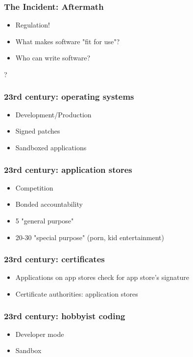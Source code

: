 \begin{frame}[fragile]
\frametitle{The Incident: Aftermath}

\begin{itemize}
\item Regulation!
\item What makes software "fit for use"?
\item Who can write software?
\end{itemize}?

\end{frame}

\begin{frame}[fragile]
\frametitle{23rd century: operating systems}

\begin{itemize}
\item Development/Production
\item Signed patches
\item Sandboxed applications
\end{itemize}

\end{frame}

\begin{frame}[fragile]
\frametitle{23rd century: application stores}

\begin{itemize}
\item Competition
\item Bonded accountability
\item 5 "general purpose"
\item 20-30 "special purpose" (porn, kid entertainment)
\end{itemize}

\end{frame}

\begin{frame}[fragile]
\frametitle{23rd century: certificates}

\begin{itemize}
\item Applications on app stores check for app store's signature
\item Certificate authorities: application stores
\end{itemize}

\end{frame}

\begin{frame}[fragile]
\frametitle{23rd century: hobbyist coding}

\begin{itemize}
\item Developer mode
\item Sandbox
\end{itemize}

\end{frame}

